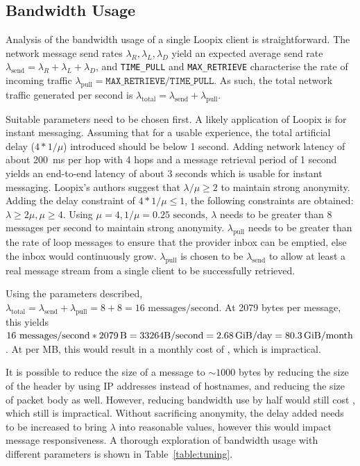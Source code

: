 \documentclass[final,dissertation.tex]{subfiles}
\begin{document}
\subsection{Bandwidth Usage}

Analysis of the bandwidth usage of a single Loopix client is straightforward. The network message send rates $\lambda_R, \lambda_L, \lambda_D$ yield an expected average send rate $\lambda_\text{send} = \lambda_R + \lambda_L + \lambda_D$, and \verb|TIME_PULL| and \verb|MAX_RETRIEVE| characterise the rate of incoming traffic $\lambda_\text{pull} = \texttt{MAX\_RETRIEVE}/\texttt{TIME\_PULL}$. As such, the total network traffic generated per second is $\lambda_\text{total} = \lambda_\text{send} + \lambda_\text{pull}$.

Suitable parameters need to be chosen first. A likely application of Loopix is for instant messaging. Assuming that for a usable experience, the total artificial delay ($4 * 1/\mu$) introduced should be below 1 second. Adding network latency of about \SI{200}{\milli\second} per hop with 4 hops and a message retrieval period of 1 second yields an end-to-end latency of about 3 seconds which is usable for instant messaging. Loopix's authors suggest that $\lambda/\mu \ge 2$ to maintain strong anonymity. Adding the delay constraint of $4* 1/\mu \le 1$, the following constraints are obtained: $\lambda \ge 2\mu, \mu \ge 4$. Using $\mu = 4, 1/\mu = 0.25\text{ seconds}$, $\lambda$ needs to be greater than 8 messages per second to maintain strong anonymity. $\lambda_\text{pull}$ needs to be greater than the rate of loop messages to ensure that the provider inbox can be emptied, else the inbox would continuously grow. $\lambda_\text{pull}$ is chosen to be $\lambda_\text{send}$ to allow at least a real message stream from a single client to be successfully retrieved.

Using the parameters described, $\lambda_\text{total} = \lambda_\text{send} + \lambda_\text{pull} = 8 + 8 = 16\text{ messages/second}$. At 2079 bytes per message, this yields $16\text{ messages/second} * \SI{2079}{\byte} = 33264\text{B}/\text{second} = \SI{2.68}{\gibi\byte}/\text{day} = \SI{80.3}{\gibi\byte}/\text{month}$. At  per MB, this would result in a monthly cost of , which is impractical.

It is possible to reduce the size of a message to $\sim1000$ bytes by reducing the size of the header by using IP addresses instead of hostnames, and reducing the size of packet body as well. However, reducing bandwidth use by half would still cost , which still is impractical. Without sacrificing anonymity, the delay added needs to be increased to bring $\lambda$ into reasonable values, however this would impact message responsiveness. A thorough exploration of bandwidth usage with different parameters is shown in Table~\ref{table:tuning}.
\end{document}
